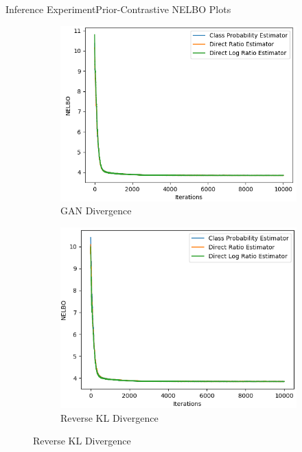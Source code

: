 \documentclass{beamer}
\begin{document}
\begin{frame}{Inference Experiment}{Prior-Contrastive NELBO Plots}
\begin{figure}
\begin{subfigure}{0.49\textwidth}
\includegraphics[width=\linewidth]{nelbos/PCADVvsPCADVexpvsPCADVgudlog.png}
\caption{GAN Divergence}
\end{subfigure}
\begin{subfigure}{0.49\textwidth}
\includegraphics[width=\linewidth]{nelbos/PCKLDvsPCKLexpvsPCKLgudlog.png}
\caption{Reverse KL Divergence}
\end{subfigure}
\end{figure}
\end{frame}
\end{document}

